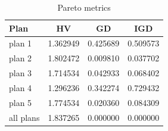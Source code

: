 \begin{table}[h!]
\centering
\begin{tabular}{lccc}
\hline
Plan & HV & GD & IGD \\
\hline
plan 1 & 1.362949 & 0.425689 & 0.509573 \\
plan 2 & 1.802472 & 0.009810 & 0.037702 \\
plan 3 & 1.714534 & 0.042933 & 0.068402 \\
plan 4 & 1.296236 & 0.342274 & 0.729432 \\
plan 5 & 1.774534 & 0.020360 & 0.084309 \\
all plans & 1.837265 & 0.000000 & 0.000000 \\
\hline
\end{tabular}
\caption{Pareto metrics}
\end{table}